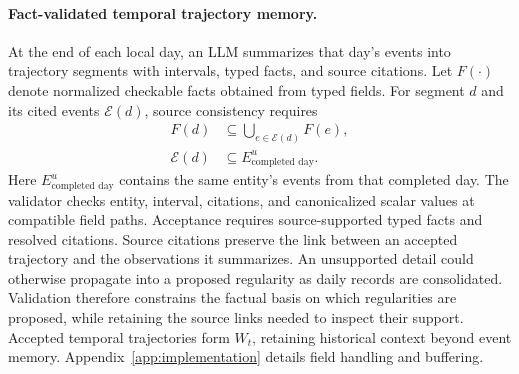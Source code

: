 \paragraph{Fact-validated temporal trajectory memory.}
At the end of each local day, an LLM summarizes that day's events into trajectory segments with intervals, typed facts, and source citations.
Let $F(\cdot)$ denote normalized checkable facts obtained from typed fields.
For segment $d$ and its cited events $\mathcal{E}(d)$, source consistency requires
\begin{equation}
\begin{aligned}
F(d)&\subseteq\bigcup_{e\in\mathcal{E}(d)}F(e),\\
\mathcal{E}(d)&\subseteq E^u_{\text{completed day}}.
\end{aligned}
\label{eq:daily_validation}
\end{equation}
Here $E^u_{\text{completed day}}$ contains the same entity's events from that completed day.
The validator checks entity, interval, citations, and canonicalized scalar values at compatible field paths.
Acceptance requires source-supported typed facts and resolved citations.
Source citations preserve the link between an accepted trajectory and the observations it summarizes.
An unsupported detail could otherwise propagate into a proposed regularity as daily records are consolidated.
Validation therefore constrains the factual basis on which regularities are proposed, while retaining the source links needed to inspect their support.
Accepted temporal trajectories form $W_t$, retaining historical context beyond event memory.
Appendix~\ref{app:implementation} details field handling and buffering.


